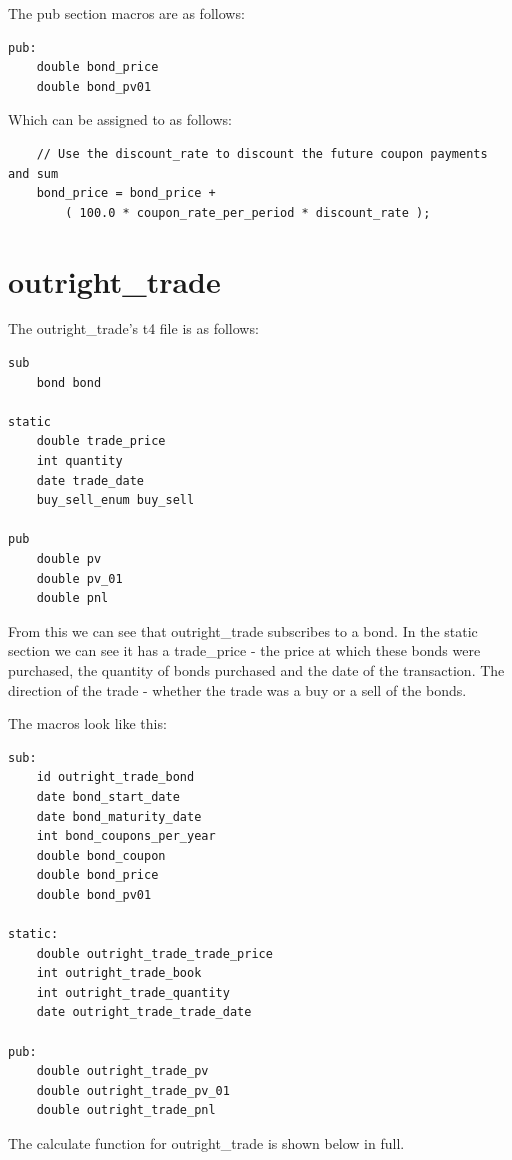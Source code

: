 \documentclass{report}
\begin{document}
The pub section macros are as follows:

\begin{verbatim}
pub:
    double bond_price
    double bond_pv01

\end{verbatim}

Which can be assigned to as follows:

\begin{verbatim}
    // Use the discount_rate to discount the future coupon payments and sum
    bond_price = bond_price + 
        ( 100.0 * coupon_rate_per_period * discount_rate );
\end{verbatim}

\section{outright_trade}

The outright_trade's t4 file is as follows:

\begin{verbatim}
sub
    bond bond

static
    double trade_price
    int quantity
    date trade_date
    buy_sell_enum buy_sell

pub
    double pv
    double pv_01
    double pnl
\end{verbatim}

From this we can see that outright_trade subscribes to a bond. In the static section we can see it has a trade_price - the price at which these bonds were purchased, the quantity of bonds purchased and the date of the transaction. The direction of the trade - whether the trade was a buy or a sell of the bonds.

The macros look like this:

\begin{verbatim}
sub:
    id outright_trade_bond
    date bond_start_date
    date bond_maturity_date
    int bond_coupons_per_year
    double bond_coupon
    double bond_price
    double bond_pv01

static:
    double outright_trade_trade_price
    int outright_trade_book
    int outright_trade_quantity
    date outright_trade_trade_date

pub:
    double outright_trade_pv
    double outright_trade_pv_01
    double outright_trade_pnl
\end{verbatim}

The calculate function for outright_trade is shown below in full.
\end{document}
